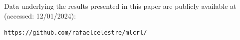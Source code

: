 \documentclass{iucr}
\begin{document}







Data underlying the results presented in this paper are publicly available at (accessed: 12/01/2024):
\begin{center}
\small{\texttt{https://github.com/rafaelcelestre/mlcrl/}}
\end{center}


\end{document}
